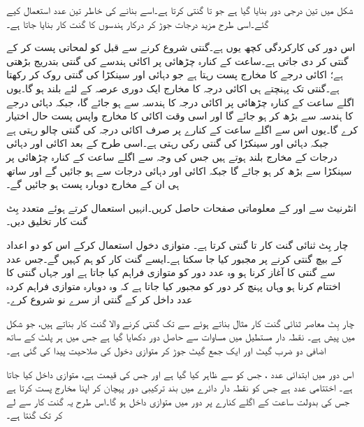 شکل  میں تین درجی دور بنایا گیا ہے جو  تا  گنتی کرتا ہے۔اسے بنانے کی خاطر تین عدد  استعمال کیے گئے۔اسی طرح مزید درجات جوڑ کر درکار ہندسوں کا گنت کار بنایا جاتا ہے۔ 


اس دور کی کارکردگی کچھ یوں ہے۔گنتی شروع کرنے سے قبل  کو لمحاتی پست کر کے گنتی  کر دی جاتی ہے۔ساعت کے کنارہ چڑھائی پر اکائی ہندسے کی گنتی بتدریج بڑھتی ہے؛ اکائی درجے کا مخارج  پست رہتا ہے جو دہائی اور سینکڑا کی گنتی روک کر رکھتا ہے۔گنتی  تک پہنچتے ہی اکائی درجہ کا مخارج  ایک دوری عرصہ کے لئے بلند ہو گا۔یوں اگلے ساعت کے کنارہ چڑھائی پر اکائی درجہ کا ہندسہ سے  ہو جائے گا، جبکہ دہائی درجے کا ہندسہ  سے بڑھ کر  ہو جائے گا اور اسی وقت اکائی کا مخارج  واپس پست حال اختیار کرے گا۔یوں اس سے اگلے ساعت کے کنارے پر صرف اکائی درجہ کی گنتی چالو رہتی ہے جبکہ دہائی اور سینکڑا کی گنتی رکی رہتی ہے۔اسی طرح  کے بعد اکائی اور دہائی درجات کے مخارج  بلند ہوتے ہیں جس کی وجہ سے اگلے ساعت کے کنارہ چڑھائی پر سینکڑا  سے بڑھ کر  ہو جائے گا جبکہ اکائی اور دہائی درجات  سے  ہو جائیں گے اور ساتھ ہی ان کے مخارج  دوبارہ پست ہو جائیں گے۔

انٹرنیٹ سے  اور  کے معلوماتی صفحات حاصل کریں۔انہیں استعمال کرتے ہوئے متعدد بِٹ گنت کار تخلیق دیں۔


چار بِٹ ثنائی گنت کار  تا  گنتی کرتا ہے۔ متوازی دخول استعمال کرکے اس کو دو اعداد کے بیچ گنتی کرنے پر مجبور کیا جا سکتا ہے۔ایسے گنت کار کو ہم کہیں گے۔جس عدد سے گنتی کا آغاز کرنا ہو وہ عدد دور کو متوازی فراہم کیا جاتا ہے اور جہاں گنتی کا اختتام کرنا ہو وہاں پہنچ کر دور کو مجبور کیا جاتا ہے کہ وہ دوبارہ متوازی فراہم کردہ عدد داخل کر کے گنتی از سرے نو شروع کرے۔

چار بِٹ معاصر ثنائی گنت کار مثال بناتے ہوئے  سے  تک گنتی کرنے والا گنت کار بناتے ہیں، جو شکل میں پیش ہے۔ نقطہ دار مستطیل میں مساوات  سے حاصل دور دکھایا گیا ہے جس میں ہر پلٹ کے ساتھ اضافی دو ضرب گیٹ اور ایک جمع گیٹ جوڑ کر متوازی دخول کی صلاحیت پیدا کی گئی ہے۔

اس دور میں ابتدائی عدد ، جس کو  سے ظاہر کیا گیا ہے اور جس کی قیمت  ہے، متوازی داخل کیا جاتا ہے۔ اختتامی عدد  ہے جس کو نقطہ دار دائرے میں بند ترکیبی دور پہچان کر اپنا مخارج پست کرتا ہے جس کی بدولت ساعت کے اگلے کنارے پر  دور میں متوازی داخل ہو گا۔اس طرح یہ گنت کار  سے لے کر  تک گنتا ہے۔

